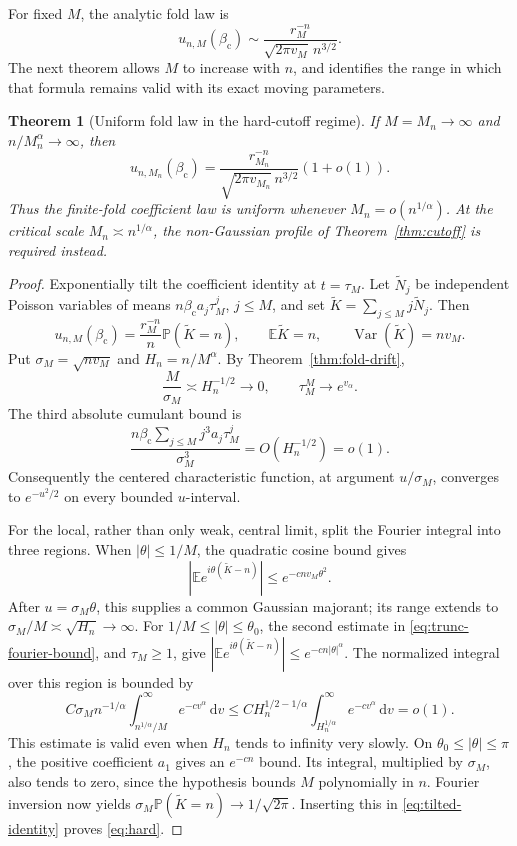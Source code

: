 \documentclass[11pt,a4paper]{article}
\numberwithin{equation}{section}
\newtheorem{theorem}{Theorem}[section]
\theoremstyle{definition}
\theoremstyle{remark}
\DeclareMathOperator{\Var}{Var}
\newcommand{\E}{\mathbb E}
\newcommand{\Prob}{\mathbb P}
\newcommand{\dd}{\,\mathrm d}
\newcommand{\bc}{\beta_{\mathrm c}}
\begin{document}
For fixed $M$, the analytic fold law is
\begin{equation}\label{eq:fixed-M}
 u_{n,M}(\bc)\sim\frac{r_M^{-n}}{\sqrt{2\pi v_M}\,n^{3/2}}.
\end{equation}
The next theorem allows $M$ to increase with $n$, and identifies the
range in which that formula remains valid with its exact moving
parameters.

\begin{theorem}[Uniform fold law in the hard-cutoff regime]
\label{thm:hard}
If $M=M_n\to\infty$ and $n/M_n^\alpha\to\infty$, then
\begin{equation}\label{eq:hard}
 u_{n,M_n}(\bc)=
 \frac{r_{M_n}^{-n}}{\sqrt{2\pi v_{M_n}}\,n^{3/2}}(1+o(1)).
\end{equation}
Thus the finite-fold coefficient law is uniform whenever
$M_n=o(n^{1/\alpha})$. At the critical scale $M_n\asymp n^{1/\alpha}$,
the non-Gaussian profile of Theorem~\ref{thm:cutoff} is required instead.
\end{theorem}
\begin{proof}
Exponentially tilt the coefficient identity at $t=\tau_M$. Let
$\widetilde N_j$ be independent Poisson variables of means
$n\bc a_j\tau_M^j$, $j\le M$, and set
$\widetilde K=\sum_{j\le M}j\widetilde N_j$. Then
\begin{equation}\label{eq:tilted-identity}
 u_{n,M}(\bc)=\frac{r_M^{-n}}n\Prob(\widetilde K=n),\qquad
 \E\widetilde K=n,\qquad \Var(\widetilde K)=n v_M.
\end{equation}
Put $\sigma_M=\sqrt{n v_M}$ and $H_n=n/M^\alpha$. By
Theorem~\ref{thm:fold-drift},
\[
 \frac{M}{\sigma_M}\asymp H_n^{-1/2}\longrightarrow0,
 \qquad \tau_M^M\longrightarrow e^{v_\alpha}.
\]
The third absolute cumulant bound is
\[
 \frac{n\bc\sum_{j\le M}j^3a_j\tau_M^j}{\sigma_M^3}
 =O(H_n^{-1/2})=o(1).
\]
Consequently the centered characteristic function, at argument
$u/\sigma_M$, converges to $e^{-u^2/2}$ on every bounded $u$-interval.

For the local, rather than only weak, central limit, split the Fourier
integral into three regions. When $|\theta|\le1/M$, the quadratic cosine
bound gives
\[
 \left|\E e^{i\theta(\widetilde K-n)}\right|
       \le e^{-c n v_M\theta^2}.
\]
After $u=\sigma_M\theta$, this supplies a common Gaussian majorant;
its range extends to $\sigma_M/M\asymp\sqrt{H_n}\to\infty$.
For $1/M\le|\theta|\le\theta_0$, the second estimate in
\eqref{eq:trunc-fourier-bound}, and $\tau_M\ge1$, give
$\left|\E e^{i\theta(\widetilde K-n)}\right|\le e^{-c n|\theta|^\alpha}$.
The normalized integral over this region is bounded by
\[
 C\sigma_M n^{-1/\alpha}
       \int_{n^{1/\alpha}/M}^\infty e^{-c v^\alpha}\dd v
 \le C H_n^{1/2-1/\alpha}
       \int_{H_n^{1/\alpha}}^\infty e^{-c v^\alpha}\dd v=o(1).
\]
This estimate is valid even when $H_n$ tends to infinity very slowly.
On $\theta_0\le|\theta|\le\pi$, the positive coefficient $a_1$ gives an
$e^{-cn}$ bound. Its integral, multiplied by $\sigma_M$, also tends to
zero, since the hypothesis bounds $M$ polynomially in $n$.
Fourier inversion now yields
$\sigma_M\Prob(\widetilde K=n)\to1/\sqrt{2\pi}$.
Inserting this in \eqref{eq:tilted-identity} proves \eqref{eq:hard}.
\end{proof}
\end{document}
